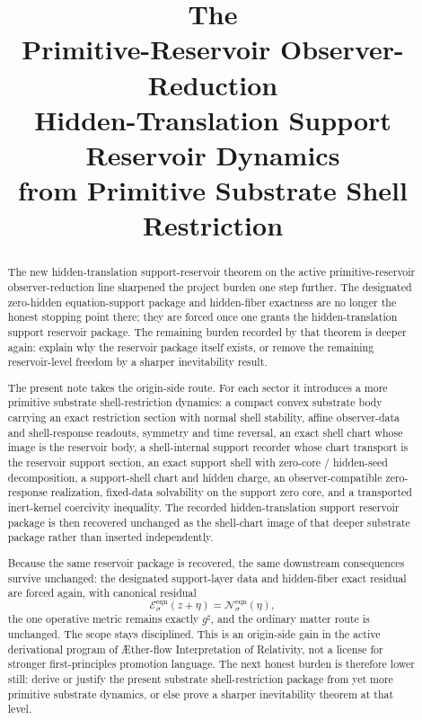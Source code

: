 \documentclass[11pt]{article}
\title{\textbf{The \TheoryName{}}\\[0.4em]
\large Primitive-Reservoir Observer-Reduction\\
\large Hidden-Translation Support Reservoir Dynamics\\
\large from Primitive Substrate Shell Restriction}
\author{}
\date{}
\newcommand{\Aflow}{\AE{}ther-flow}
\newcommand{\TheoryName}{\Aflow{} Interpretation of Relativity}
\newcommand{\CompletedMetric}{g^{\sharp}}
\newcommand{\EqnResidual}[1]{\mathcal E_{#1}^{\mathrm{eqn}}}
\newcommand{\EqnLin}[1]{\mathcal N_{#1}^{\mathrm{eqn}}}
\begin{document}
\maketitle

\begin{abstract}
The new hidden-translation support-reservoir theorem on the active primitive-reservoir observer-reduction line sharpened the project burden one step further. The designated zero-hidden equation-support package and hidden-fiber exactness are no longer the honest stopping point there; they are forced once one grants the hidden-translation support reservoir package. The remaining burden recorded by that theorem is deeper again: explain why the reservoir package itself exists, or remove the remaining reservoir-level freedom by a sharper inevitability result.

The present note takes the origin-side route. For each sector it introduces a more primitive substrate shell-restriction dynamics: a compact convex substrate body carrying an exact restriction section with normal shell stability, affine observer-data and shell-response readouts, symmetry and time reversal, an exact shell chart whose image is the reservoir body, a shell-internal support recorder whose chart transport is the reservoir support section, an exact support shell with zero-core / hidden-seed decomposition, a support-shell chart and hidden charge, an observer-compatible zero-response realization, fixed-data solvability on the support zero core, and a transported inert-kernel coercivity inequality. The recorded hidden-translation support reservoir package is then recovered unchanged as the shell-chart image of that deeper substrate package rather than inserted independently.

Because the same reservoir package is recovered, the same downstream consequences survive unchanged: the designated support-layer data and hidden-fiber exact residual are forced again, with canonical residual
\[
\EqnResidual{\sigma}(z+\eta)=\EqnLin{\sigma}(\eta),
\]
the one operative metric remains exactly \(\CompletedMetric\), and the ordinary matter route is unchanged. The scope stays disciplined. This is an origin-side gain in the active derivational program of \TheoryName{}, not a license for stronger first-principles promotion language. The next honest burden is therefore lower still: derive or justify the present substrate shell-restriction package from yet more primitive substrate dynamics, or else prove a sharper inevitability theorem at that level.
\end{abstract}
\end{document}
